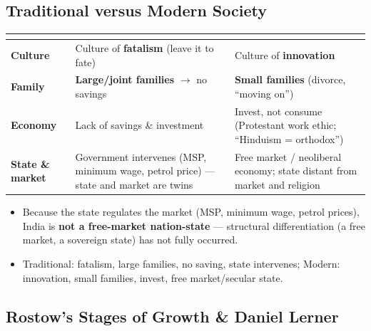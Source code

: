 \sectiondivider

\subsection{Traditional versus Modern Society}

\begin{ComparisonBox}
\begin{tabularx}{\linewidth}{>{\bfseries}lYY}
 &  &  \\
\midrule
Culture & Culture of \textbf{fatalism} (leave it to fate) & Culture of \textbf{innovation} \\
Family & \textbf{Large/joint families} $\rightarrow$ no savings & \textbf{Small families} (divorce, ``moving on'') \\
Economy & Lack of savings \& investment & Invest, not consume (Protestant work ethic; ``Hinduism = orthodox'') \\
State \& market & Government intervenes (MSP, minimum wage, petrol price) --- state and market are twins & Free market / neoliberal economy; state distant from market and religion \\
\bottomrule
\end{tabularx}
\end{ComparisonBox}

\begin{CriticalPoint}
\begin{itemize}
    \item Because the state regulates the market (MSP, minimum wage, petrol prices), India is \textbf{not a free-market nation-state} --- structural differentiation (a free market, a sovereign state) has not fully occurred.
\end{itemize}
\end{CriticalPoint}

\begin{QuickRevision}
\begin{itemize}
    \item Traditional: fatalism, large families, no saving, state intervenes; Modern: innovation, small families, invest, free market/secular state.
\end{itemize}
\end{QuickRevision}

\sectiondivider

\subsection{Rostow's Stages of Growth \& Daniel Lerner}


